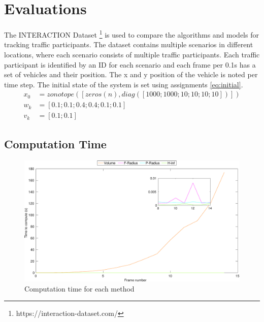 \chapter{Evaluations} \label{ch:result}
The INTERACTION Dataset \footnote{https://interaction-dataset.com/} is used to compare the algorithms and models for tracking traffic participants. The dataset contains multiple scenarios in different locations, where each scenario consists of multiple traffic participants. Each traffic participant is identified by an ID for each scenario and each frame per 0.1s has a set of vehicles and their position. The x and y position of the vehicle is noted per time step. The initial state of the system is set using assignments \eqref{eq:initial}.
\begin{equation}
\label{eq:initial}
\begin{split}
x_0 &= zonotope([zeros(n), diag([1000;1000;10;10;10;10])])\\
w_k &= [0.1;0.1;0.4;0.4;0.1;0.1]\\
v_k &= [0.1;0.1]
\end{split}
\end{equation}

\section{Computation Time}
\begin{figure}
\label{fig:timegraph}
\centering
\includegraphics[width=\linewidth]{figures/timegraphh}
\caption{Computation time for each method}
\end{figure}

